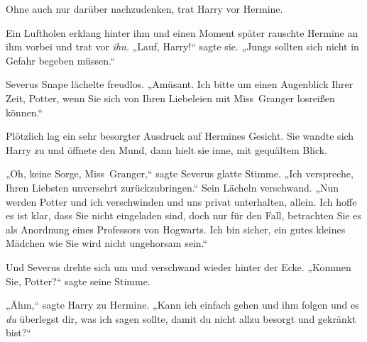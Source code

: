 Ohne auch nur darüber nachzudenken, trat Harry vor Hermine.

Ein Luftholen erklang hinter ihm und einen Moment später rauschte Hermine an ihm vorbei und trat vor \emph{ihn}. „Lauf, Harry!“ sagte sie. „Jungs sollten sich nicht in Gefahr begeben müssen.“

Severus Snape lächelte freudlos. „Amüsant. Ich bitte um einen Augenblick Ihrer Zeit, Potter, wenn Sie sich von Ihren Liebeleien mit Miss~Granger losreißen können.“

Plötzlich lag ein sehr besorgter Ausdruck auf Hermines Gesicht. Sie wandte sich Harry zu und öffnete den Mund, dann hielt sie inne, mit gequältem Blick.

„Oh, keine Sorge, Miss~Granger,“ sagte Severus glatte Stimme. „Ich verspreche, Ihren Liebsten unversehrt zurückzubringen.“ Sein Lächeln verschwand. „Nun werden Potter und ich verschwinden und uns privat unterhalten, allein. Ich hoffe es ist klar, dass Sie nicht eingeladen sind, doch nur für den Fall, betrachten Sie es als Anordnung eines Professors von Hogwarts. Ich bin sicher, ein gutes kleines Mädchen wie Sie wird nicht ungehorsam sein.“

Und Severus drehte sich um und verschwand wieder hinter der Ecke. „Kommen Sie, Potter?“ sagte seine Stimme.

„Ähm,“ sagte Harry zu Hermine. „Kann ich einfach gehen und ihm folgen und es \emph{du} überlegst dir, was ich sagen sollte, damit du nicht allzu besorgt und gekränkt bist?“

